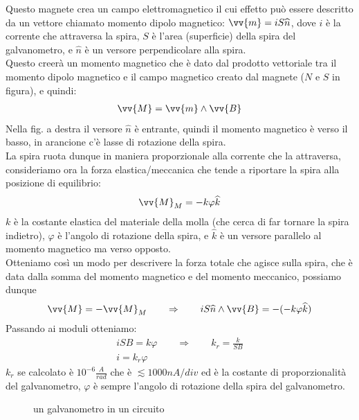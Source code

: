\documentclass[a4paper, oneside]{article}
\begin{document}
Questo magnete crea un campo elettromagnetico il cui effetto può essere descritto da un vettore chiamato momento dipolo magnetico: $\vv{m} = i S \widehat{n}$, dove $i$ è la corrente che attraversa la spira, $S$ è l'area (superficie) della spira del galvanometro, e $\widehat{n}$ è un versore perpendicolare alla spira.\\
Questo creerà un momento magnetico che è dato dal prodotto vettoriale tra il momento dipolo magnetico e il campo magnetico creato dal magnete ($N$ e $S$ in figura), e quindi:
\begin{gather*}
        \vv{M} = \vv{m} \land \vv{B}\\
\end{gather*}
Nella fig. a destra il versore $\widehat{n}$ è entrante, quindi il momento magnetico è verso il basso, in arancione c'è lasse di rotazione della spira.\\
La spira ruota dunque in maniera proporzionale alla corrente che la attraversa, consideriamo ora la forza elastica/meccanica che tende a riportare la spira alla posizione di equilibrio:
\begin{gather*}
        \vv{M}_M = -k \varphi \widehat{k}
\end{gather*}
$k$ è la costante elastica del materiale della molla (che cerca di far tornare la spira indietro), $\varphi$ è l'angolo di rotazione della spira, e $\widehat{k}$ è un versore parallelo al momento magnetico ma verso opposto.\\
Otteniamo così un modo per descrivere la forza totale che agisce sulla spira, che è data dalla somma del momento magnetico e del momento meccanico, possiamo dunque 
\begin{gather*}
    \vv{M} = - \vv{M}_M \qquad \Rightarrow \qquad i S \widehat{n} \land \vv{B} =- (- k \varphi \widehat{k})\\
\end{gather*}
Passando ai moduli otteniamo:
\begin{gather*}
    i S B = k \varphi \qquad\Rightarrow\qquad k_r = \frac{k}{S B}\\
    i = k_r \varphi
\end{gather*}
$k_r$ se calcolato è $10^{-6} \frac{A}{rad}$ che è $\lesssim  1000 n A/div$ ed è la costante di proporzionalità del galvanometro, $\varphi$ è sempre l'angolo di rotazione della spira del galvanometro.\\
\par
\begin{figure}
    \caption{un galvanometro in un circuito}
\end{figure}
\end{document}
